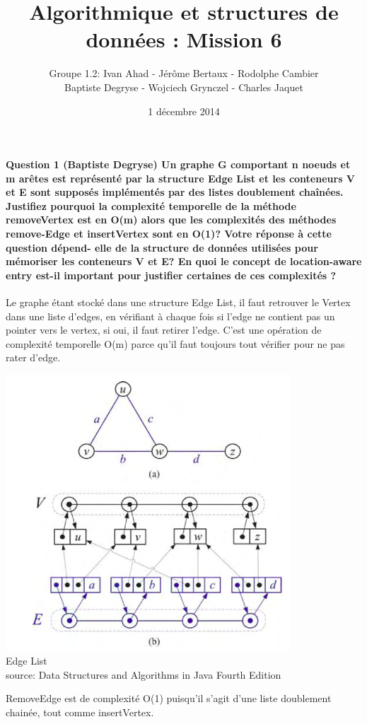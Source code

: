 \documentclass[a4paper]{article}
\title{Algorithmique et structures de données : Mission 6}
\date{1 décembre 2014}
\author{Groupe 1.2: Ivan Ahad - Jérôme Bertaux - Rodolphe Cambier \\ 
	Baptiste Degryse - Wojciech Grynczel - Charles Jaquet}
\begin{document}
\maketitle
\paragraph{Question 1 (Baptiste Degryse)   Un graphe G comportant n noeuds et m arêtes est représenté par la structure Edge List
et les conteneurs V et E sont supposés implémentés par des listes doublement chaînées. Justifiez pourquoi la complexité temporelle de la méthode removeVertex est en O(m) alors que les complexités des méthodes remove-Edge et insertVertex sont en O(1)? Votre réponse à cette question dépend-
elle de la structure de données utilisées pour mémoriser les conteneurs
V et E? En quoi le concept de
location-aware entry
est-il important pour justifier certaines
de ces complexités ?}
Le graphe étant stocké dans une structure Edge List, il faut retrouver le Vertex dans une liste d'edges, en vérifiant à chaque fois si l'edge ne contient pas un pointer vers le vertex, si oui, il faut retirer l'edge. C'est une opération de complexité temporelle O(m) parce qu'il faut toujours tout vérifier pour ne pas rater d'edge.\\
\begin{center}
\includegraphics[width=0.8\textwidth]{edgeslist.png}\\
Edge List\\
source: Data Structures and Algorithms in Java Fourth Edition
\end{center}
RemoveEdge est de complexité O(1) puisqu'il s'agit d'une liste doublement chainée, tout comme insertVertex.\\
\end{document}
